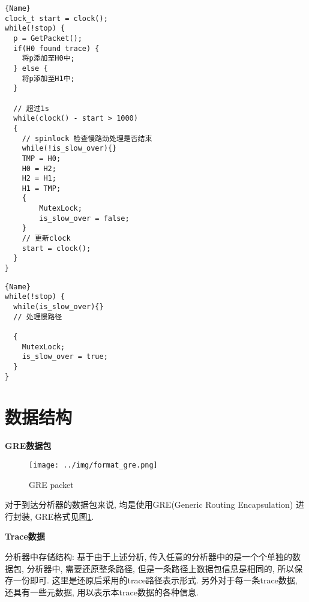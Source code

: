 \noindent\begin{minipage}{.55\textwidth}
\begin{lstlisting}[caption=快路径线程,frame=tlrb]{Name}
clock_t start = clock();
while(!stop) {
  p = GetPacket();
  if(H0 found trace) {
    将p添加至H0中;
  } else {
    将p添加至H1中;
  }

  // 超过1s
  while(clock() - start > 1000)
  {
    // spinlock 检查慢路劲处理是否结束
    while(!is_slow_over){}
    TMP = H0;
    H0 = H2;
    H2 = H1;
    H1 = TMP;
    {
        MutexLock;
        is_slow_over = false;
    }
    // 更新clock
    start = clock();
  }
}
\end{lstlisting}
\end{minipage}\hfill
\begin{minipage}{.38\textwidth}
\begin{lstlisting}[caption=慢路径线程,frame=tlrb]{Name}
while(!stop) {
  while(is_slow_over){}
  // 处理慢路径

  {
    MutexLock;
    is_slow_over = true;
  }
}
\end{lstlisting}
\end{minipage}



\section{数据结构}
\label{chap:数据结构}

\textbf{GRE数据包}

\begin{figure}[htbp!]
  \centering
  \texttt{[image: ../img/format\_gre.png]}
  \caption{GRE packet}
  \label{fig:gre_packet}
\end{figure}

对于到达分析器的数据包来说, 均是使用GRE(Generic Routing Encapsulation)
进行封装, GRE格式见图\ref{fig:gre_packet}.

\textbf{Trace数据}

分析器中存储结构: 基于由于上述分析,
传入任意的分析器中的是一个个单独的数据包, 分析器中, 需要还原整条路径,
但是一条路径上数据包信息是相同的, 所以保存一份即可.
这里是还原后采用的trace路径表示形式. 另外对于每一条trace数据,
还具有一些元数据, 用以表示本trace数据的各种信息.

